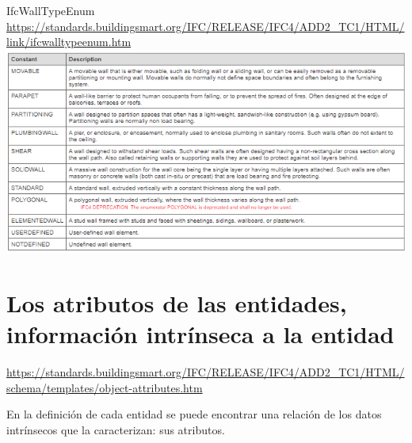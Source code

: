\documentclass[spanish,12pt,a4paper,final,oneside]{book}
\begin{document}
IfcWallTypeEnum
\\ \url{https://standards.buildingsmart.org/IFC/RELEASE/IFC4/ADD2_TC1/HTML/link/ifcwalltypeenum.htm}
\\ \includegraphics[width=\textwidth]{Definicion de IfcWallTypeEnum}



\section{Los \textbf{atributos} de las entidades, información intrínseca a la entidad}
\url{https://standards.buildingsmart.org/IFC/RELEASE/IFC4/ADD2_TC1/HTML/schema/templates/object-attributes.htm}

En la definición de cada entidad se puede encontrar una relación de los datos intrínsecos que la caracterizan: sus atributos.
\end{document}
